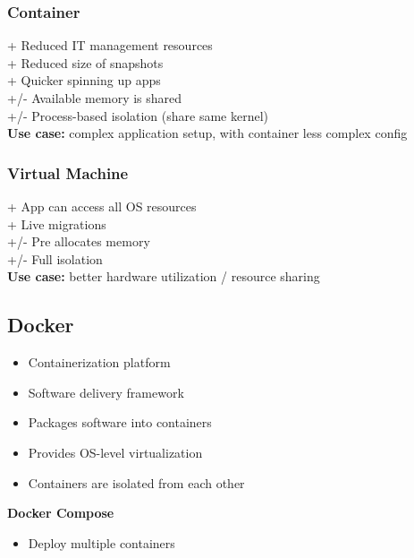 \subsubsection{Container}
+ Reduced IT management resources\\
+ Reduced size of snapshots\\
+ Quicker spinning up apps\\
+/- Available memory is shared\\
+/- Process-based isolation (share same kernel)\\
\textbf{Use case:} complex application setup, with container less complex config

\subsubsection{Virtual Machine}
+ App can access all OS resources\\
+ Live migrations\\
+/- Pre allocates memory\\
+/- Full isolation\\
\textbf{Use case:} better hardware utilization / resource sharing

\subsection{Docker}
\begin{itemize}
    \item Containerization platform
    \item Software delivery framework
    \item Packages software into containers
    \item Provides OS-level virtualization
    \item Containers are isolated from each other
\end{itemize}
\textbf{Docker Compose}
\begin{itemize}
    \item Deploy multiple containers
\end{itemize}